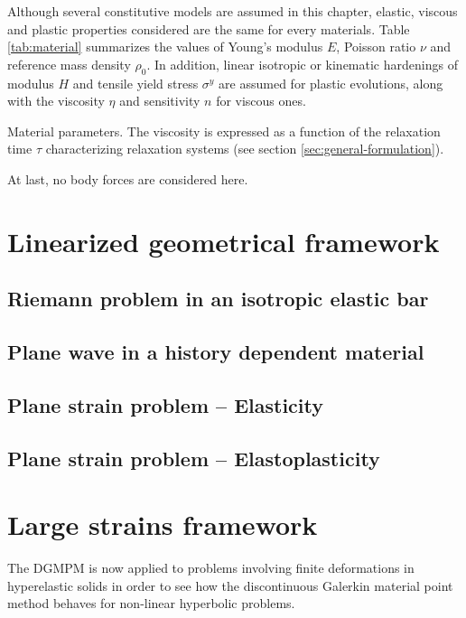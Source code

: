 Although several constitutive models are assumed in this chapter, elastic, viscous and plastic properties considered are the same for every materials. Table \ref{tab:material} summarizes the values of Young's modulus $E$, Poisson ratio $\nu$ and reference mass density $\rho_0$.
In addition, linear isotropic or kinematic hardenings of modulus $H$ and tensile yield stress $\sigma^y$ are assumed for plastic evolutions, along with the viscosity $\eta$ and sensitivity $n$ for viscous ones.
\begin{table}[h!]
  \centering
  
  \caption{Material parameters. The viscosity is expressed as a function of the relaxation time $\tau$ characterizing relaxation systems (see section \ref{sec:general-formulation}).}
  \label{tab:material}
\end{table}
At last, no body forces are considered here.
\section{Linearized geometrical framework}
\label{sec:hpp_simulations}

\subsection{Riemann problem in an isotropic elastic bar}
\label{subsec:hpp_bar}


\subsection{Plane wave in a history dependent material}
\label{subsec:hpp_planewave}


\subsection{Plane strain problem -- Elasticity}
\label{subsec:el_planestrain}


\subsection{Plane strain problem -- Elastoplasticity}
\label{subsec:ep_planestrain}


\section{Large strains framework}
\label{sec:he_simulations}
The DGMPM is now applied to problems involving finite deformations in hyperelastic solids in order to see how the discontinuous Galerkin material point method behaves for non-linear hyperbolic problems.
